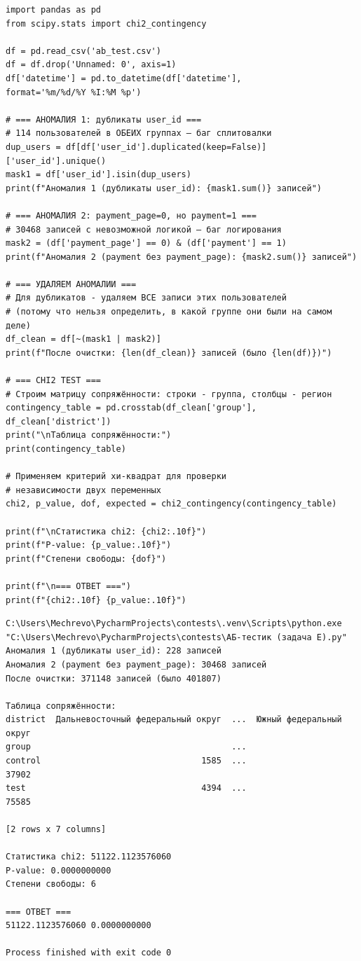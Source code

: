 \documentclass[pract]{SCWorks}
\begin{document}
\begin{verbatim}
import pandas as pd
from scipy.stats import chi2_contingency

df = pd.read_csv('ab_test.csv')
df = df.drop('Unnamed: 0', axis=1)
df['datetime'] = pd.to_datetime(df['datetime'], 
format='%m/%d/%Y %I:%M %p')

# === АНОМАЛИЯ 1: дубликаты user_id ===
# 114 пользователей в ОБЕИХ группах — баг сплитовалки
dup_users = df[df['user_id'].duplicated(keep=False)]['user_id'].unique()
mask1 = df['user_id'].isin(dup_users)
print(f"Аномалия 1 (дубликаты user_id): {mask1.sum()} записей")

# === АНОМАЛИЯ 2: payment_page=0, но payment=1 ===
# 30468 записей с невозможной логикой — баг логирования
mask2 = (df['payment_page'] == 0) & (df['payment'] == 1)
print(f"Аномалия 2 (payment без payment_page): {mask2.sum()} записей")

# === УДАЛЯЕМ АНОМАЛИИ ===
# Для дубликатов - удаляем ВСЕ записи этих пользователей 
# (потому что нельзя определить, в какой группе они были на самом деле)
df_clean = df[~(mask1 | mask2)]
print(f"После очистки: {len(df_clean)} записей (было {len(df)})")

# === CHI2 TEST ===
# Строим матрицу сопряжённости: строки - группа, столбцы - регион
contingency_table = pd.crosstab(df_clean['group'], df_clean['district'])
print("\nТаблица сопряжённости:")
print(contingency_table)

# Применяем критерий хи-квадрат для проверки 
# независимости двух переменных
chi2, p_value, dof, expected = chi2_contingency(contingency_table)

print(f"\nСтатистика chi2: {chi2:.10f}")
print(f"P-value: {p_value:.10f}")
print(f"Степени свободы: {dof}")

print(f"\n=== ОТВЕТ ===")
print(f"{chi2:.10f} {p_value:.10f}")
\end{verbatim}

\begin{Verbatim}[fontsize=\small, breaklines=true, breaksymbol={\tiny\ensuremath{\hookrightarrow}}]
C:\Users\Mechrevo\PycharmProjects\contests\.venv\Scripts\python.exe "C:\Users\Mechrevo\PycharmProjects\contests\АБ-тестик (задача E).py" 
Аномалия 1 (дубликаты user_id): 228 записей
Аномалия 2 (payment без payment_page): 30468 записей
После очистки: 371148 записей (было 401807)

Таблица сопряжённости:
district  Дальневосточный федеральный округ  ...  Южный федеральный округ
group                                        ...                         
control                                1585  ...                    37902
test                                   4394  ...                    75585

[2 rows x 7 columns]

Статистика chi2: 51122.1123576060
P-value: 0.0000000000
Степени свободы: 6

=== ОТВЕТ ===
51122.1123576060 0.0000000000

Process finished with exit code 0
\end{Verbatim}
\end{document}
